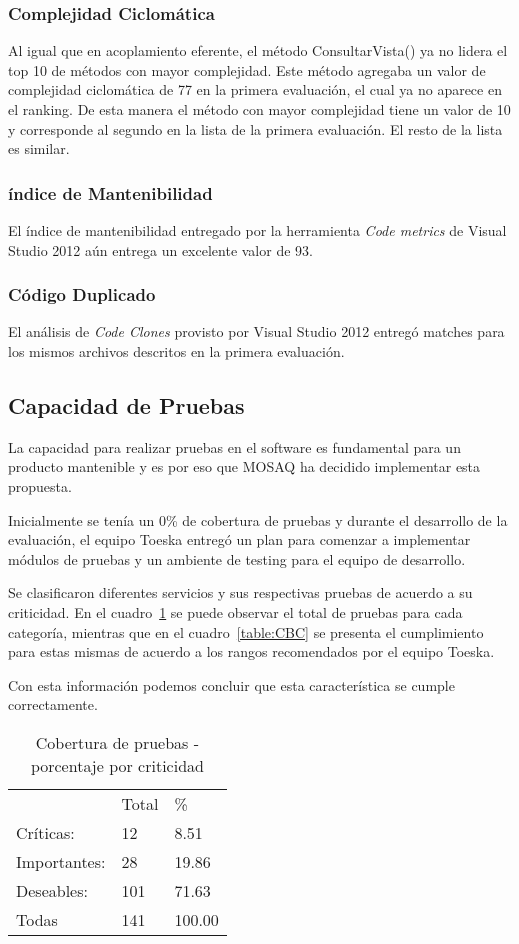 \subsubsection{Complejidad Ciclomática}
Al igual que en acoplamiento eferente, el método ConsultarVista() ya no lidera el top 10 de métodos
con mayor complejidad. Este método agregaba un valor de complejidad 
ciclomática de 77 en la primera evaluación, el cual ya no aparece en el ranking. 
De esta manera el método con mayor complejidad tiene un valor de 10 y 
corresponde al segundo en la lista de la primera evaluación. El resto de la lista
es similar.
\subsubsection{índice de Mantenibilidad}
El índice de mantenibilidad entregado por la herramienta \textit{Code metrics} de Visual Studio 2012
aún entrega un excelente valor de 93.
\subsubsection{Código Duplicado}
El análisis de \textit{Code Clones} provisto por Visual Studio 2012 entregó matches para los 
mismos archivos descritos en la primera evaluación.
\subsection{Capacidad de Pruebas}
\label{cap}

La capacidad para realizar pruebas en el software es fundamental para un producto mantenible y es por eso
que MOSAQ ha decidido implementar esta propuesta.

Inicialmente se tenía un 0\% de cobertura de pruebas y durante el desarrollo de la evaluación, el equipo Toeska entregó un plan para comenzar a implementar
módulos de pruebas y un ambiente de testing para el equipo de desarrollo.

Se clasificaron diferentes servicios y sus respectivas pruebas de acuerdo a su criticidad.
En el cuadro~\ref{table:CBPC} se puede observar el total de pruebas para cada 
categoría, mientras que en el cuadro~\ref{table:CBC} se presenta el cumplimiento 
para estas mismas de acuerdo a los rangos recomendados por el equipo Toeska.

Con esta información podemos concluir que esta característica se cumple correctamente.
\begin{table}
  \small
\centering
    \begin{tabular}{lll}
    ~               & Total  & \%        \\
     		Críticas:    &  		12  &  		8.51   \\
     		Importantes: &  		28  &  		19.86  \\
     		Deseables:   &  		101 &  		71.63  \\
     		Todas        &  		141 &  		100.00 \\ \hline
    \end{tabular}
     \caption{Cobertura de pruebas - porcentaje por criticidad}
    \label{table:CBPC}
\end{table}

